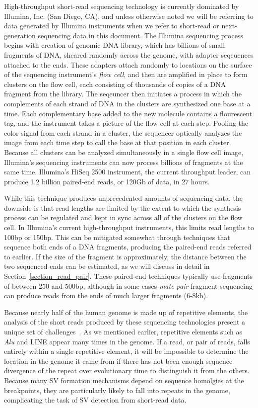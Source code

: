 High-throughput short-read sequencing technology is currently dominated by Illumina, Inc. (San Diego, CA), and unless otherwise noted we will be referring to data generated by Illumina instruments when we refer to short-read or next-generation sequencing data in this document. The Illumina sequencing process begins with creation of genomic DNA library, which has billions of small fragments of DNA, sheared randomly across the genome, with adapter seqeuences attached to the ends. These adapters attach randomly to locations on the surface of the sequencing instrument's \emph{flow cell}, and then are amplified in place to form clusters on the flow cell, each consisting of thousands of copies of a DNA fragment from the library. The seqeuncer then initiates a process in which the complements of each strand of DNA in the clusters are synthesized one base at a time. Each complementary base added to the new molecule contains a flourescent tag, and the instrument takes a picture of the flow cell at each step. Pooling the color signal from each strand in a cluster, the sequencer optically analyzes the image from each time step to call the base at that position in each cluster. Because all clusters can be analyzed simultaneously in a single flow cell image, Illumina's sequencing instruments can now process billions of fragments at the same time. Illumina's HiSeq 2500 instrument, the current throughput leader, can produce 1.2 billion paired-end reads, or 120Gb of data, in 27 hours. 

While this technique produces unprecedented amounts of sequencing data, the downside is that read lengths are limited by the extent to which the synthesis process can be regulated and kept in sync across all of the clusters on the flow cell. In Illumina's current high-throughput instruments, this limits read lengths to 100bp or 150bp. This can be mitigated somewhat through techniques that sequence both ends of a DNA fragments, producing the paired-end reads referred to earlier. If the size of the fragment is approximately, the distance between the two sequenced ends can be estimated, as we will discuss in detail in Section~\ref{section_read_pair}. These paired-end techniques typically use fragments of between 250 and 500bp, although in some cases \emph{mate pair} fragment sequencing can produce reads from the ends of much larger fragments (6-8kb).

Because nearly half of the human genome is made up of repetitive elements, the analysis of the short reads produced by these sequencing technologies present a unique set of challenges~\cite{Treangen:2011p1810}. As we mentioned earlier, repetitive elements such as \emph{Alu} and LINE appear many times in the genome. If a read, or pair of reads, falls entirely within a single repetitive element, it will be impossible to determine the location in the genome it came from if there has not been enough sequence divergence of the repeat over evolutionary time to distinguish it from the others. Because many SV formation mechanisms depend on sequence homolgies at the breakpoints, they are particularly likely to fall into repeats in the genome, complicating the task of SV detection from short-read data.

